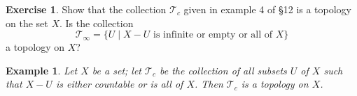 \documentclass[11pt,a4paper,twoside]{article}
\theoremstyle{definition}
\newcounter{excounter}
\newtheorem{exercise}[excounter]{Exercise}
\newcounter{examplecounter}
\theoremstyle{plain}
\newtheorem{example}[examplecounter]{Example}
\begin{document}
\begin{exercise}

  Show that the collection $\mathscr{T}_c$ given in example 4 of \S 12 is a topology on the set $X$.
  Is the collection
  \begin{equation*}
    \mathscr{T}_\infty = \{ U \mid X - U \text{ is infinite or empty or all of } X \}
  \end{equation*}
  a topology on $X$?

\end{exercise}

\bigskip
\begin{example}
  Let $X$ be a set; let $\mathscr{T}_c$ be the collection of all subsets $U$ of $X$ such that $X - U$
  is either countable or is all of $X$. Then $\mathscr{T}_c$ is a topology on $X$.
\end{example}
  
\end{document}
